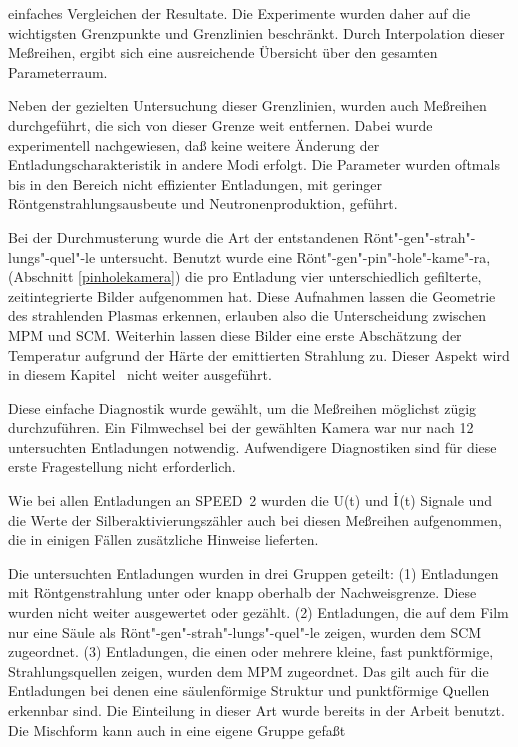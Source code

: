 einfaches Vergleichen der Resultate. Die Experimente wurden daher auf
die wichtigsten Grenzpunkte und Grenzlinien beschränkt. Durch
Interpolation dieser Meßreihen, ergibt sich eine ausreichende Übersicht
über den gesamten Parameterraum.
\par
Neben der gezielten Untersuchung dieser Grenzlinien, wurden auch
Meßreihen durchgeführt, die sich von dieser Grenze weit entfernen.
Dabei wurde experimentell nachgewiesen, daß keine weitere Änderung der
Entladungscharakteristik in andere Modi erfolgt. Die Parameter wurden
oftmals bis in den Bereich nicht effizienter Entladungen, mit geringer
Röntgenstrahlungsausbeute und Neutronenproduktion, geführt.
\par
Bei der Durchmusterung wurde die Art der entstandenen
Rönt"-gen"-strah"-lungs"-quel"-le untersucht. Benutzt wurde eine
Rönt"-gen"-pin"-hole"-kame"-ra, (Abschnitt \vref{pinholekamera})
die pro Entladung vier unterschiedlich gefilterte, zeitintegrierte
Bilder aufgenommen hat. Diese Aufnahmen lassen die Geometrie des
strahlenden Plasmas erkennen, erlauben also die Unterscheidung
zwischen MPM und SCM. Weiterhin lassen diese Bilder eine erste
Abschätzung der Temperatur aufgrund der Härte der emittierten
Strahlung zu. Dieser Aspekt wird in diesem Kapitel \thesection\
nicht weiter ausgeführt.
\par
Diese einfache Diagnostik wurde gewählt, um die Meßreihen möglichst
zügig durchzuführen. Ein Filmwechsel bei der gewählten Kamera war nur
nach 12 untersuchten Entladungen notwendig. Aufwendigere Diagnostiken
sind für diese erste Fragestellung nicht erforderlich.
\par
Wie bei allen Entladungen an SPEED~2 wurden die U(t) und $\dot{\rm
I}$(t) Signale und die Werte der Silberaktivierungszähler auch bei
diesen Meßreihen aufgenommen, die in einigen Fällen zusätzliche
Hinweise lieferten.
\par
Die untersuchten Entladungen wurden in drei Gruppen geteilt: (1)
Entladungen mit Röntgenstrahlung unter oder knapp oberhalb der
Nachweisgrenze. Diese wurden nicht weiter ausgewertet oder
gezählt. (2) Entladungen, die auf dem Film nur eine Säule als
Rönt"-gen"-strah"-lungs"-quel"-le zeigen, wurden dem SCM
zugeordnet. (3) Entladungen, die einen oder mehrere kleine, fast
punktförmige, Strahlungsquellen zeigen, wurden dem MPM zugeordnet.
Das gilt auch für die Entladungen bei denen eine säulenförmige
Struktur und punktförmige Quellen erkennbar sind. Die Einteilung
in dieser Art wurde bereits in der Arbeit \cite{roewe:phd}
benutzt. Die Mischform kann auch in eine eigene Gruppe gefaßt
